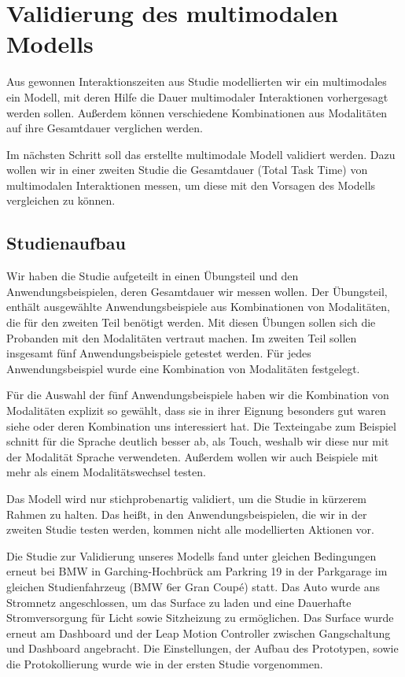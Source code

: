 \chapter[Validierung]{Validierung des multimodalen Modells}\label{cha:Evaluation}
Aus gewonnen Interaktionszeiten aus Studie modellierten wir ein multimodales ein Modell, mit deren Hilfe die Dauer multimodaler Interaktionen vorhergesagt werden sollen.
Außerdem können verschiedene Kombinationen aus Modalitäten auf ihre Gesamtdauer verglichen werden. 

Im nächsten Schritt soll das erstellte multimodale Modell validiert werden. 
Dazu wollen wir in einer zweiten Studie die Gesamtdauer (Total Task Time) von multimodalen Interaktionen messen, um diese mit den Vorsagen des Modells vergleichen zu können. 

\section[Studienaufbau]{Studienaufbau}
Wir haben die Studie aufgeteilt in einen Übungsteil und den Anwendungsbeispielen, deren Gesamtdauer wir messen wollen. 
Der Übungsteil, enthält ausgewählte Anwendungsbeispiele aus Kombinationen von Modalitäten, die für den zweiten Teil benötigt werden. 
Mit diesen Übungen sollen sich die Probanden mit den Modalitäten vertraut machen. 
Im zweiten Teil sollen insgesamt fünf Anwendungsbeispiele getestet werden. Für jedes Anwendungsbeispiel wurde eine Kombination von Modalitäten festgelegt. 

Für die Auswahl der fünf Anwendungsbeispiele haben wir die Kombination von Modalitäten explizit so gewählt, dass sie in ihrer Eignung besonders gut waren siehe  oder deren Kombination uns interessiert hat. Die Texteingabe zum Beispiel schnitt für die Sprache deutlich besser ab, als Touch, weshalb wir diese nur mit der Modalität Sprache verwendeten. Außerdem wollen wir auch Beispiele mit mehr als einem Modalitätswechsel testen. 

Das Modell wird nur stichprobenartig validiert, um die Studie in kürzerem Rahmen zu halten. 
Das heißt, in den Anwendungsbeispielen, die wir in der zweiten Studie testen werden, kommen nicht alle modellierten Aktionen vor. 

Die Studie zur Validierung unseres Modells fand unter gleichen Bedingungen erneut bei BMW in Garching-Hochbrück am Parkring 19 in der Parkgarage im gleichen Studienfahrzeug (BMW 6er Gran Coupé) statt. 
Das Auto wurde ans Stromnetz angeschlossen, um das Surface zu laden und eine Dauerhafte Stromversorgung für Licht sowie Sitzheizung zu ermöglichen.
Das Surface wurde erneut am Dashboard und der Leap Motion Controller zwischen Gangschaltung und Dashboard angebracht. Die Einstellungen, der Aufbau des Prototypen, sowie die Protokollierung wurde wie in der ersten Studie vorgenommen. 

